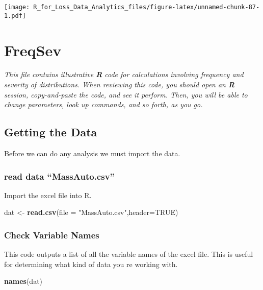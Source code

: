 \documentclass[]{book}
\newenvironment{Shaded}{\begin{snugshade}}{\end{snugshade}}
\newcommand{\KeywordTok}[1]{\textcolor[rgb]{0.13,0.29,0.53}{\textbf{#1}}}
\newcommand{\DataTypeTok}[1]{\textcolor[rgb]{0.13,0.29,0.53}{#1}}
\newcommand{\StringTok}[1]{\textcolor[rgb]{0.31,0.60,0.02}{#1}}
\newcommand{\OtherTok}[1]{\textcolor[rgb]{0.56,0.35,0.01}{#1}}
\newcommand{\NormalTok}[1]{#1}
\theoremstyle{definition}
\theoremstyle{definition}
\theoremstyle{definition}
\theoremstyle{remark}
\begin{document}
\texttt{[image: R\_for\_Loss\_Data\_Analytics\_files/figure-latex/unnamed-chunk-87-1.pdf]}

\chapter{FreqSev}\label{freqsev}

\emph{This file contains illustrative \textbf{R} code for calculations
involving frequency and severity of distributions. When reviewing this
code, you should open an \textbf{R} session, copy-and-paste the code,
and see it perform. Then, you will be able to change parameters, look up
commands, and so forth, as you go. }

\section{Getting the Data}\label{getting-the-data}

Before we can do any analysis we must import the data.

\subsection{\texorpdfstring{read data
``MassAuto.csv''}{read data MassAuto.csv}}\label{read-data-massauto.csv}

Import the excel file into R.

\begin{Shaded}
\begin{Highlighting}[]
\NormalTok{dat <-}\StringTok{ }\KeywordTok{read.csv}\NormalTok{(}\DataTypeTok{file =} \StringTok{"MassAuto.csv"}\NormalTok{,}\DataTypeTok{header=}\OtherTok{TRUE}\NormalTok{)}
\end{Highlighting}
\end{Shaded}

\subsection{Check Variable Names}\label{check-variable-names}

This code outputs a list of all the variable names of the excel file.
This is useful for determining what kind of data you re working with.

\begin{Shaded}
\begin{Highlighting}[]
\KeywordTok{names}\NormalTok{(dat)}
\end{Highlighting}
\end{Shaded}
\end{document}
